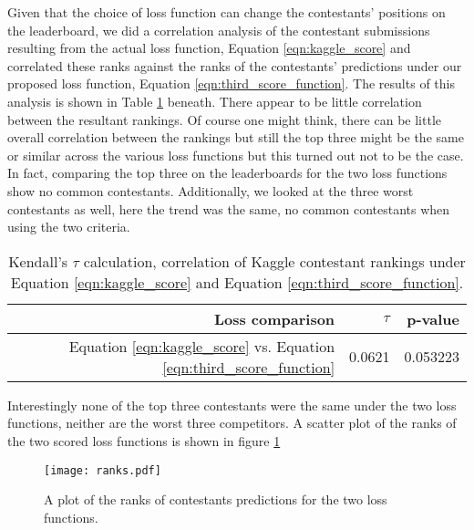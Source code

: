 %

Given that the choice of loss function can change the contestants' positions on the leaderboard, we did a correlation analysis of the contestant submissions resulting from the actual loss function, Equation \ref{eqn:kaggle_score} and correlated these ranks against the ranks of the contestants'  predictions under our proposed loss function, Equation \ref{eqn:third_score_function}. The results of this analysis is shown in Table \ref{tab:kendall_tau_table} beneath. There appear to be little correlation between the resultant rankings. Of course one might think, there can be little overall correlation between the rankings but still the top three might be the same or similar across the various loss functions but this turned out not to be the case. In fact, comparing the top three on the leaderboards for the two loss functions show no common contestants. Additionally, we looked at the three worst contestants as well, here the trend was the same, no common contestants when using the two criteria. 

\begin{table}[ht]
\centering
\begin{tabular}{rrr}
  \hline
Loss comparison & $\tau$ & p-value \\ 
  \hline
Equation \ref{eqn:kaggle_score} vs. Equation \ref{eqn:third_score_function} &0.0621 & 0.053223 \\ 
   \hline
\end{tabular}
\label{tab:kendall_tau_table}
\caption{Kendall's $\tau$ calculation, correlation of Kaggle contestant rankings under Equation  \ref{eqn:kaggle_score} and Equation \ref{eqn:third_score_function}.}
\end{table}

Interestingly none of the top three contestants were the same under the two loss functions, neither are the worst three competitors. A scatter plot of the ranks of the two scored loss functions is shown in figure \ref{fig:ranks}

\begin{figure}[H]
\centering
\texttt{[image: ranks.pdf]}
\caption{A plot of the ranks of contestants predictions for the two loss functions.}\label{fig:ranks}
\end{figure}



